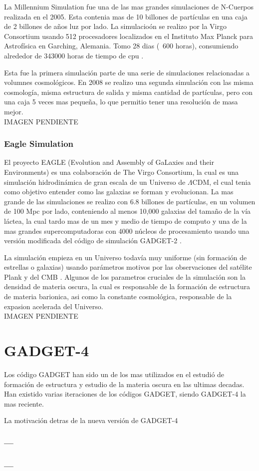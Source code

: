 La Millennium Simulation fue una de las mas grandes simulaciones de N-Cuerpos realizada en el 2005. Esta contenia mas de 10 billones de partículas en una caja de 2 billones de años luz por lado. La simulacioón se realizo por la Virgo Consortium usando 512 procesadores localizados en el Instituto Max Planck para Astrofísica en Garching, Alemania. Tomo 28 dias (~600 horas), consumiendo alrededor  de  343000 horas de tiempo de cpu \cite{2005Natur.435..629S}.

Esta fue la primera simulación parte de una serie de simulaciones relacionadas a volumnes cosmológicos. En 2008 se realizo una segunda simulación con las misma cosmología, misma estructura de salida y misma cantidad de partículas, pero con una caja 5 veces mas pequeña, lo que permitio tener una resolución de masa mejor.
\\

{\LARGE
IMAGEN PENDIENTE
}


\subsubsection{Eagle Simulation}
El proyecto EAGLE (Evolution and Assembly of GaLaxies and their Environments)  es una colaboración de The Virgo Consortium, la cual es una simulación hidrodinámica de gran escala de un Universo de $\Lambda$CDM, el cual tenia como objetivo entender como las galaxias se forman y evolucionan. La mas grande de las simulaciones se realizo con  6.8 billones de partículas, en un volumen de 100 Mpc por lado, conteniendo al menos 10,000 galaxias del tamaño de la vía láctea, la cual tardo mas de un mes y medio de tiempo de computo y una de la mas grandes supercomputadoras con 4000 núcleos de procesamiento usando una versión modificada del código de simulación GADGET-2 \cite{2015MNRAS.450.1937C, 2015MNRAS.446..521S}.

La simulación empieza en un Universo todavía muy uniforme (sin formación de estrellas o galaxias) usando parámetros motivos por las observaciones del satélite Plank y del CMB \cite{ 2013ApJS..208...20B, 2020A&A...641A...1P}. Algunos de los parametros cruciales de la simulación son la densidad de materia oscura, la cual es responsable de la formación de estructura de materia barionica, asi como la constante cosmológica, responsable de la expasion acelerada del Universo.
\\

{\LARGE
IMAGEN PENDIENTE
}


\section{GADGET-4}
Los código GADGET han sido un de los mas utilizados en el estudió de formación de estructura y estudio de la materia oscura en las ultimas decadas. Han existido varias iteraciones de los códigos GADGET, siendo GADGET-4 la mas reciente.

La motivación detras de la nueva versión de GADGET-4 
\cite{2021MNRAS.506.2871S}

\subsubsection{---}




\subsubsection{---}
